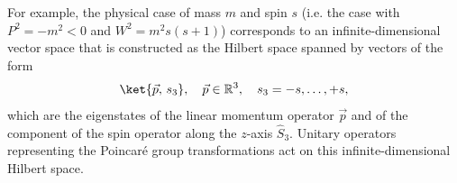 For example, the physical case of mass $m$ and spin $s$ (i.e. the case with $P^2 = -m^2 < 0$ and $W^2 = m^2 s(s + 1)$) corresponds to an infinite-dimensional vector space that is constructed as the Hilbert space spanned by vectors of the form
\[
    \ket{\vec{p},\, s_3}, \quad \vec{p} \in \mathbb{R}^3, \quad s_3 = -s, \dots, +s,
\]
which are the eigenstates of the linear momentum operator $\vec{p}$ and of the component of the spin operator along the $z$-axis $\hat{S}_3$. Unitary operators representing the Poincaré group transformations act on this infinite-dimensional Hilbert space.